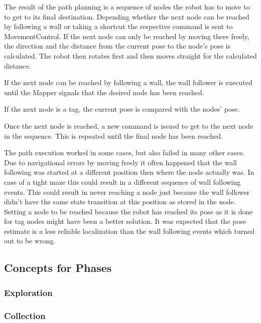 The result of the path planning is a sequence of nodes the robot has to move to to get to its final destination.
Depending whether the next node can be reached by following a wall or taking a shortcut the respective command is sent to MovementControl.
If the next node can only be reached by moving there freely, the direction and the distance from the current pose to the node's pose is calculated. The robot then rotates first and then moves straight for the calculated distance. 

If the next node can be reached by following a wall, the wall follower is executed until the Mapper signals that the desired node has been reached.

If the next node is a tag, the current pose is compared with the nodes' pose.

Once the next node is reached, a new command is issued to get to the next node in the sequence. This is repeated until the final node has been reached.

The path execution worked in some cases, but also failed in many other cases. Due to navigational errors by moving freely it often happened that the wall following was started at a different position then where the node actually was. In case of a tight maze this could result in a different sequence of wall following events. This could result in never reaching a node just because the wall follower didn't have the same state transition at this position as stored in the node. Setting a node to be reached because the robot has reached its pose as it is done for tag nodes might have been a better solution. It was expected that the pose estimate is a less reliable localization than the wall following events which turned out to be wrong.    


\subsection{Concepts for Phases}
\label{subsec:conceptsStrategies}
\subsubsection{Exploration}
\subsubsection{Collection}